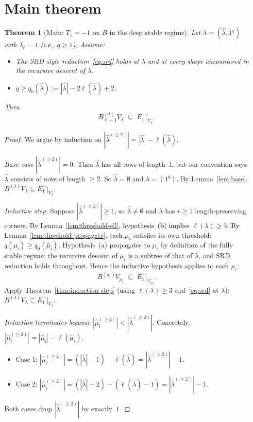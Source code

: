 \documentclass[11pt]{article}
\newtheorem{theorem}{Theorem}
\theoremstyle{definition}
\begin{document}
\section{Main theorem}\label{sec:main}

\begin{theorem}[Main: $T_1 = -1$ on $B$ in the deep stable regime]\label{thm:main}
Let $\lambda = (\hat\lambda, 1^q)$ with $\lambda_\ell = 1$ (i.e.,
$q \ge 1$). Assume:
\begin{itemize}[topsep=0.2em,itemsep=0.1em]
\item[(a)] The SRD-style reduction~\eqref{eq:srd} holds at $\lambda$
and at every shape encountered in the recursive descent of $\lambda$.
\item[(b)] $q \ge q_0(\hat\lambda) := |\hat\lambda| - 2\ell(\hat\lambda) + 2$.
\end{itemize}
Then
\[
   B^{(\lambda)}_{\ell+1} V_\lambda
   \;\subseteq\; E_1^-|_{V_\lambda}.
\]
\end{theorem}

\begin{proof}
We argue by induction on $|\hat\lambda^{(\ge 2)}| = |\hat\lambda| - \ell(\hat\lambda)$.

\emph{Base case $|\hat\lambda^{(\ge 2)}| = 0$.} Then $\hat\lambda$ has
all rows of length~$1$, but our convention says $\hat\lambda$ consists
of rows of length $\ge 2$. So $\hat\lambda = \emptyset$ and
$\lambda = (1^q)$. By Lemma~\ref{lem:base}, $B^{(\lambda)} V_\lambda
\subseteq E_1^-|_{V_\lambda}$.

\emph{Inductive step.} Suppose $|\hat\lambda^{(\ge 2)}| \ge 1$, so
$\hat\lambda \ne \emptyset$ and $\lambda$ has $r \ge 1$
length-preserving corners. By Lemma~\ref{lem:threshold-ell},
hypothesis~(b) implies $\ell(\lambda) \ge 3$. By
Lemma~\ref{lem:threshold-propagate}, each $\mu_i$ satisfies its own
threshold: $q(\mu_i) \ge q_0(\hat\mu_i)$. Hypothesis~(a) propagates to
$\mu_i$ by definition of the fully stable regime: the recursive descent
of $\mu_i$ is a subtree of that of $\lambda$, and SRD reduction holds
throughout. Hence the inductive hypothesis applies to each $\mu_i$:
\[
   B^{(\mu_i)} V_{\mu_i} \;\subseteq\; E_1^-|_{V_{\mu_i}}.
\]
Apply Theorem~\ref{thm:induction-step} (using $\ell(\lambda) \ge 3$
and~\eqref{eq:srd} at $\lambda$):
$B^{(\lambda)} V_\lambda \subseteq E_1^-|_{V_\lambda}$.

\emph{Induction terminates because $|\hat\mu_i^{(\ge 2)}| < |\hat\lambda^{(\ge 2)}|$.}
Concretely, $|\hat\mu_i^{(\ge 2)}| = |\hat\mu_i| - \ell(\hat\mu_i)$.
\begin{itemize}[topsep=0.2em,itemsep=0.1em]
\item Case 1: $|\hat\mu_i^{(\ge 2)}| = (|\hat\lambda| - 1) - \ell(\hat\lambda)
= |\hat\lambda^{(\ge 2)}| - 1$.
\item Case 2: $|\hat\mu_i^{(\ge 2)}| = (|\hat\lambda| - 2) - (\ell(\hat\lambda) - 1)
= |\hat\lambda^{(\ge 2)}| - 1$.
\end{itemize}
Both cases drop $|\hat\lambda^{(\ge 2)}|$ by exactly~$1$.
\end{proof}
\end{document}
